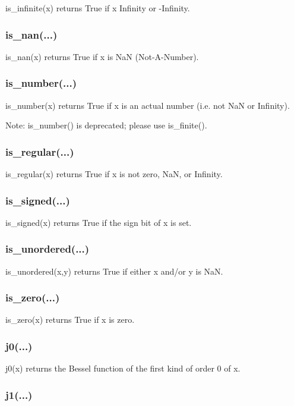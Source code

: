 is\_infinite(x) returns True if x Infinity or -Infinity.

\subsubsection{is\_nan(...)}

is\_nan(x) returns True if x is NaN (Not-A-Number).

\subsubsection{is\_number(...)}

is\_number(x) returns True if x is an actual number (i.e. not NaN or Infinity).

Note: is\_number() is deprecated; please use is\_finite().

\subsubsection{is\_regular(...)}

is\_regular(x) returns True if x is not zero, NaN, or Infinity.

\subsubsection{is\_signed(...)}

is\_signed(x) returns True if the sign bit of x is set.

\subsubsection{is\_unordered(...)}

is\_unordered(x,y) returns True if either x and/or y is NaN.

\subsubsection{is\_zero(...)}

is\_zero(x) returns True if x is zero.

\subsubsection{j0(...)}

j0(x) returns the Bessel function of the first kind of order 0 of x.

\subsubsection{j1(...)}

